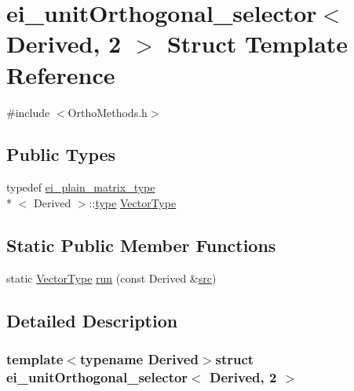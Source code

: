 \hypertarget{structei__unit_orthogonal__selector_3_01_derived_00_012_01_4}{\section{ei\-\_\-unit\-Orthogonal\-\_\-selector$<$ Derived, 2 $>$ Struct Template Reference}
\label{structei__unit_orthogonal__selector_3_01_derived_00_012_01_4}
}


{\ttfamily \#include $<$Ortho\-Methods.\-h$>$}

\subsection*{Public Types}
\begin{DoxyCompactItemize}
\item 
typedef \hyperlink{structei__plain__matrix__type}{ei\-\_\-plain\-\_\-matrix\-\_\-type}\\*
$<$ Derived $>$\-::\hyperlink{glext_8h_a7d05960f4f1c1b11f3177dc963a45d86}{type} \hyperlink{structei__unit_orthogonal__selector_3_01_derived_00_012_01_4_a6dd55b78ea13036e2c789b8041167f27}{Vector\-Type}
\end{DoxyCompactItemize}
\subsection*{Static Public Member Functions}
\begin{DoxyCompactItemize}
\item 
static \hyperlink{structei__unit_orthogonal__selector_3_01_derived_00_012_01_4_a6dd55b78ea13036e2c789b8041167f27}{Vector\-Type} \hyperlink{structei__unit_orthogonal__selector_3_01_derived_00_012_01_4_a35f9ab770800dfc35622f2745b312578}{run} (const Derived \&\hyperlink{glext_8h_a72e0fdf0f845ded60b1fada9e9195cd7}{src})
\end{DoxyCompactItemize}


\subsection{Detailed Description}
\subsubsection*{template$<$typename Derived$>$struct ei\-\_\-unit\-Orthogonal\-\_\-selector$<$ Derived, 2 $>$}



